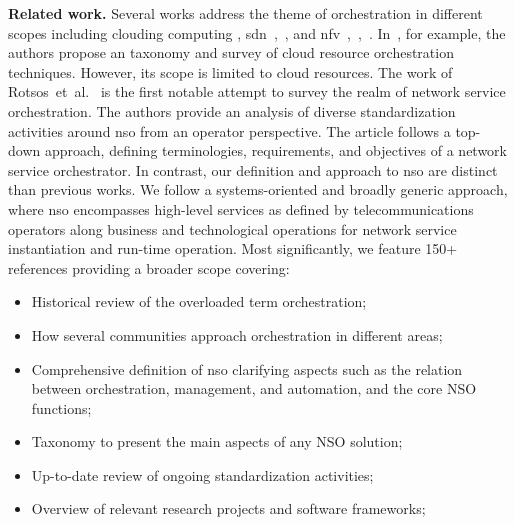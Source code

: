 \noindent \textbf{Related work.} Several works address the theme of orchestration in different scopes including clouding computing \cite{Weerasiri2017}, \gls{sdn}~\cite{Jarraya2014},~\cite{surveySDN}, and \gls{nfv}~\cite{YongLi2015Software-DefinedSurvey},~\cite{Mijumbi2016NetworkChallenges},~\cite{Bhamare2016}. In~\cite{Weerasiri2017}, for example, the authors propose an taxonomy and survey of cloud resource orchestration techniques. However, its scope is limited to cloud resources. The work of Rotsos~et~al.~\cite{Rotsos2017NetworkSurvey} is the first notable attempt to survey the realm of network service orchestration. The authors provide an analysis of diverse standardization activities around \gls{nso} from an operator perspective. The article follows a top-down approach, defining terminologies, requirements, and objectives of a network service orchestrator. In contrast, our definition and approach to \gls{nso} are distinct than previous works. We follow a systems-oriented and broadly generic approach,  where \gls{nso} encompasses high-level services as defined by telecommunications operators along business and technological operations for network service instantiation and run-time operation. Most significantly, we feature 150+ references providing a broader scope covering:
\begin{itemize}
\item Historical review of the overloaded term orchestration;
\item How several communities approach orchestration in different areas;
\item Comprehensive definition of \gls{nso} clarifying aspects such as the relation between orchestration, management, and automation, and the core NSO functions;
\item Taxonomy to present the main aspects of any NSO solution;
\item Up-to-date review of ongoing standardization activities;
\item Overview of relevant research projects and software frameworks;
\end{itemize}

